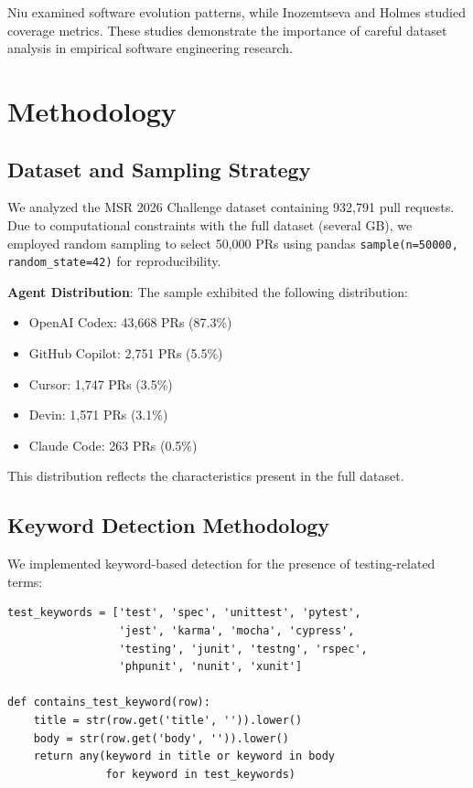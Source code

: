 \documentclass[conference]{IEEEtran}
\begin{document}
Niu \cite{niu2022role} examined software evolution patterns, while Inozemtseva and Holmes \cite{inozemtseva2014coverage} studied coverage metrics. These studies demonstrate the importance of careful dataset analysis in empirical software engineering research.

\section{Methodology}

\subsection{Dataset and Sampling Strategy}

We analyzed the MSR 2026 Challenge dataset containing 932,791 pull requests. Due to computational constraints with the full dataset (several GB), we employed random sampling to select 50,000 PRs using pandas \texttt{sample(n=50000, random\_state=42)} for reproducibility.

\textbf{Agent Distribution}: The sample exhibited the following distribution:
\begin{itemize}
    \item OpenAI Codex: 43,668 PRs (87.3\%)
    \item GitHub Copilot: 2,751 PRs (5.5\%)
    \item Cursor: 1,747 PRs (3.5\%)
    \item Devin: 1,571 PRs (3.1\%)
    \item Claude Code: 263 PRs (0.5\%)
\end{itemize}

This distribution reflects the characteristics present in the full dataset.

\subsection{Keyword Detection Methodology}

We implemented keyword-based detection for the presence of testing-related terms:

\begin{verbatim}
test_keywords = ['test', 'spec', 'unittest', 'pytest', 
                 'jest', 'karma', 'mocha', 'cypress', 
                 'testing', 'junit', 'testng', 'rspec',
                 'phpunit', 'nunit', 'xunit']

def contains_test_keyword(row):
    title = str(row.get('title', '')).lower()
    body = str(row.get('body', '')).lower()
    return any(keyword in title or keyword in body 
               for keyword in test_keywords)
\end{verbatim}
\end{document}
